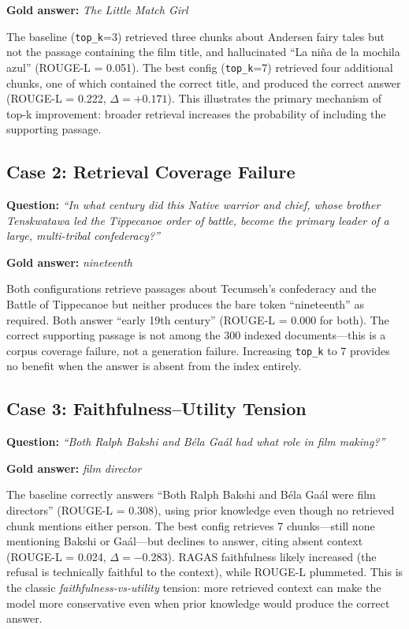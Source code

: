 \documentclass[11pt,a4paper]{article}
\begin{document}
\textbf{Gold answer:} \emph{The Little Match Girl}

The baseline (\texttt{top\_k}=3) retrieved three chunks about Andersen fairy
tales but not the passage containing the film title, and hallucinated
``La ni\~na de la mochila azul'' (ROUGE-L = 0.051). The best config
(\texttt{top\_k}=7) retrieved four additional chunks, one of which contained
the correct title, and produced the correct answer (ROUGE-L = 0.222,
$\Delta = +0.171$). This illustrates the primary mechanism of top-k improvement:
broader retrieval increases the probability of including the supporting passage.

\subsection{Case 2: Retrieval Coverage Failure}

\textbf{Question:} \emph{``In what century did this Native warrior and chief,
whose brother Tenskwatawa led the Tippecanoe order of battle, become the primary
leader of a large, multi-tribal confederacy?''}

\textbf{Gold answer:} \emph{nineteenth}

Both configurations retrieve passages about Tecumseh's confederacy and the
Battle of Tippecanoe but neither produces the bare token ``nineteenth'' as
required. Both answer ``early 19th century'' (ROUGE-L = 0.000 for both). The
correct supporting passage is not among the 300 indexed documents---this is a
corpus coverage failure, not a generation failure. Increasing \texttt{top\_k}
to 7 provides no benefit when the answer is absent from the index entirely.

\subsection{Case 3: Faithfulness--Utility Tension}

\textbf{Question:} \emph{``Both Ralph Bakshi and B\'ela Ga\'al had what role in
film making?''}

\textbf{Gold answer:} \emph{film director}

The baseline correctly answers ``Both Ralph Bakshi and B\'ela Ga\'al were film
directors'' (ROUGE-L = 0.308), using prior knowledge even though no retrieved
chunk mentions either person. The best config retrieves 7 chunks---still none
mentioning Bakshi or Ga\'al---but declines to answer, citing absent context
(ROUGE-L = 0.024, $\Delta = -0.283$). RAGAS faithfulness likely increased (the
refusal is technically faithful to the context), while ROUGE-L plummeted. This
is the classic \emph{faithfulness-vs-utility} tension: more retrieved context
can make the model more conservative even when prior knowledge would produce the
correct answer.
\end{document}
